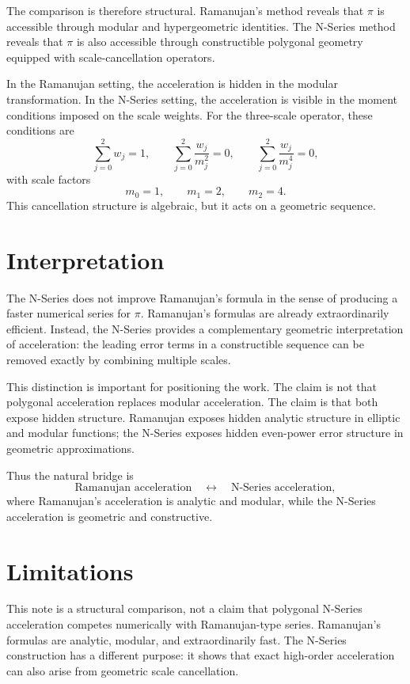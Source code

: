 \documentclass[11pt]{article}
\begin{document}
The comparison is therefore structural. Ramanujan's method reveals that $\pi$
is accessible through modular and hypergeometric identities. The N-Series
method reveals that $\pi$ is also accessible through constructible polygonal
geometry equipped with scale-cancellation operators.

In the Ramanujan setting, the acceleration is hidden in the modular
transformation. In the N-Series setting, the acceleration is visible in the
moment conditions imposed on the scale weights. For the three-scale operator,
these conditions are
\[
  \sum_{j=0}^{2} w_j = 1,
  \qquad
  \sum_{j=0}^{2} \frac{w_j}{m_j^{2}} = 0,
  \qquad
  \sum_{j=0}^{2} \frac{w_j}{m_j^{4}} = 0,
\]
with scale factors
\[
  m_0=1, \qquad m_1=2, \qquad m_2=4 .
\]
This cancellation structure is algebraic, but it acts on a geometric sequence.

\section{Interpretation}

The N-Series does not improve Ramanujan's formula in the sense of producing a
faster numerical series for $\pi$. Ramanujan's formulas are already
extraordinarily efficient. Instead, the N-Series provides a complementary
geometric interpretation of acceleration: the leading error terms in a
constructible sequence can be removed exactly by combining multiple scales.

This distinction is important for positioning the work. The claim is not that
polygonal acceleration replaces modular acceleration. The claim is that both
expose hidden structure. Ramanujan exposes hidden analytic structure in
elliptic and modular functions; the N-Series exposes hidden even-power error
structure in geometric approximations.

Thus the natural bridge is
\[
  \text{Ramanujan acceleration}
  \quad\longleftrightarrow\quad
  \text{N-Series acceleration},
\]
where Ramanujan's acceleration is analytic and modular, while the N-Series
acceleration is geometric and constructive.
\section{Limitations}

This note is a structural comparison, not a claim that polygonal N-Series
acceleration competes numerically with Ramanujan-type series.  Ramanujan's
formulas are analytic, modular, and extraordinarily fast.  The N-Series
construction has a different purpose: it shows that exact high-order
acceleration can also arise from geometric scale cancellation.
\end{document}
